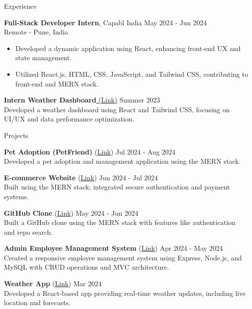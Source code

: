 \documentclass{resume} %
\begin{document}
\begin{rSection}{Experience}

\textbf{Full-Stack Developer Intern}, Capabl India \hfill May 2024 - Jun 2024 \\
Remote - Pune, India
\begin{itemize}[noitemsep, topsep=0pt, leftmargin=*]
    \item Developed a dynamic application using React, enhancing front-end UX and state management.
    \item Utilized React.js, HTML, CSS, JavaScript, and Tailwind CSS, contributing to front-end and MERN stack.
\end{itemize}

\textbf{Intern Weather Dashboard}\href{https://weather-app-d00u.onrender.com/}{ (Link)} \hfill Summer 2023 \\
Developed a weather dashboard using React and Tailwind CSS, focusing on UI/UX and data performance optimization.

\end{rSection}


\begin{rSection}{Projects}

\item \textbf{Pet Adoption (PetFriend)} (\href{https://petfriend5756.onrender.com/}{Link}) \hfill Jul 2024 - Aug 2024 \\
Developed a pet adoption and management application using the MERN stack.

\item \textbf{E-commerce Website} (\href{https://estore-sangam5756.onrender.com}{Link}) \hfill Jun 2024 - Jul 2024 \\
Built using the MERN stack; integrated secure authentication and payment systems.

\item \textbf{GitHub Clone} (\href{https://github.com/Sangam5756/mern-github-app}{Link}) \hfill May 2024 - Jun 2024 \\
Built a GitHub clone using the MERN stack with features like authentication and repo search.

\item \textbf{Admin Employee Management System} (\href{https://github.com/Sangam5756/Employee_Management_Admin_Panel}{Link}) \hfill Apr 2024 - May 2024 \\
Created a responsive employee management system using Express, Node.js, and MySQL with CRUD operations and MVC architecture.

\item \textbf{Weather App} (\href{https://weather-app-d00u.onrender.com/}{Link}) \hfill Mar 2024 \\
Developed a React-based app providing real-time weather updates, including live location and forecasts.

\end{rSection}
\end{document}
